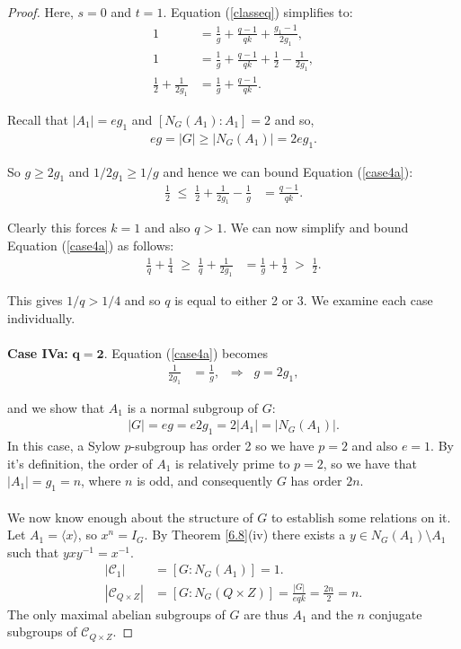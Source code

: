 \documentclass[a4paper , 11pt]{book}
\theoremstyle{definition}
\theoremstyle{remark}
\begin{document}
\begin{proof} Here, $s = 0$ and $t = 1$. Equation (\ref{classeq}) simplifies to:
\begin{align}\label{case4a} 1 &= \frac{1}{g} + \frac{q-1}{qk} +  \frac{g_1-1}{2g_1}, \nonumber
\\ 1 &= \frac{1}{g} + \frac{q-1}{qk} + \frac{1}{2} - \frac{1}{2g_1}, \nonumber
\\ \frac{1}{2} + \frac{1}{2g_1} &= \frac{1}{g} + \frac{q-1}{qk}.
\end{align}

Recall that $|A_1|=eg_1$ and $[N_G(A_1): A_1] = 2$ and so,
\begin{align*} eg = |G| \geq |N_G(A_1)| = 2eg_1.
\end{align*}

So $g \geq 2g_1$ and $1/2g_1 \geq 1/g$ and hence we can bound Equation (\ref{case4a}):
\begin{align*} \frac{1}{2} \; \leq \; \frac{1}{2} + \frac{1}{2g_1} - \frac{1}{g} &= \frac{q-1}{qk}.
\end{align*}

Clearly this forces $k = 1$ and also $q > 1$. We can now simplify and bound Equation (\ref{case4a}) as follows:
\begin{align*} \frac{1}{q} + \frac{1}{4} \; \geq \; \frac{1}{q} + \frac{1}{2g_1} &= \frac{1}{g} + \frac{1}{2} \; > \; \frac{1}{2}. 
\end{align*}

This gives $1/q > 1/4$ and so $q$ is equal to either 2 or 3. We examine each case individually. \\
\\
\textbullet \space \textbf{Case IVa:} $\pmb{q = 2}$. Equation (\ref{case4a}) becomes
\begin{align*} \frac{1}{2g_1} &= \frac{1}{g}, \; \; \Longrightarrow \; \; g = 2g_1,
\end{align*}

and we show that $A_1$ is a normal subgroup of $G$:
\begin{align*} |G| = eg = e2g_1 = 2|A_1| = |N_G(A_1)|. 
\end{align*}
In this case, a Sylow $p$-subgroup has order 2 so we have $p=2$ and also $e=1$. By it's definition, the order of $A_1$ is relatively prime to $p=2$, so we have that $|A_1|= g_1 = n$, where $n$ is odd, and consequently $G$ has order $2n$. \\  
\\
We now know enough about the structure of $G$ to establish some relations on it. Let $A_1 = \langle x \rangle$, so $x^n = I_G$. By Theorem \ref{6.8}(iv) there exists a $y \in N_G(A_1) \! \setminus \! A_1$ such that $y x y^{-1} = x^{-1}$.
\begin{align*} |\mathcal{C}_1| &= [G : N_G(A_1)] = 1.
\\ |\mathcal{C}_{Q \times Z}| &= [G : N_G(Q \times Z)] = \frac{|G|}{eqk} = \frac{2n}{2} = n.
\end{align*}
The only maximal abelian subgroups of $G$ are thus $A_1$ and the $n$ conjugate subgroups of $\mathcal{C}_{Q \times Z}$.


\end{proof}
\end{document}
